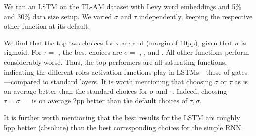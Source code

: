 We ran an LSTM on the TL-AM dataset with Levy word embeddings and 5\% and 30\% data size setup. We varied $\sigma$ and $\tau$ independently, keeping the respective other function at its default. 

We find that the top two choices for $\tau$ are \pentan{} and \mytanh{} (margin of 10pp), given that $\sigma$ is sigmoid. For $\tau=$ \mytanh{}, the best choices are $\sigma=$ \pentan{}, \sigmoid, and \mytanh{}. All other functions perform considerably worse. Thus, the top-performers are all saturating functions, indicating the different roles activation functions play in LSTMs---those of gates---compared to standard layers. It is worth mentioning that choosing $\sigma$ or $\tau$ as \pentan{} is on average better than the standard choices for $\sigma$ and $\tau$. %
Indeed, choosing $\tau=\sigma=$ \pentan{} is on average 2pp better than the default choices of $\tau,\sigma$.

It is further worth mentioning that the best \best{} results for the LSTM are roughly 5pp better (absolute) than the best corresponding choices for the simple RNN. 

